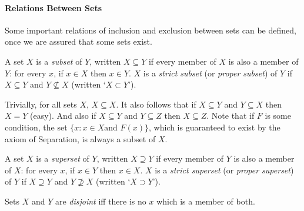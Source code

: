 \paragraph{Relations Between Sets} Some important relations of inclusion and exclusion between sets can be defined, once we are assured that some sets exist.
\begin{definition}[Subset] A set $X$ is a \emph{subset} of $Y$, written
   $X \subseteq Y$ if every
    member of $X$ is also a member of $Y$: for every $x$, if $x \in X$
    then $x \in Y$. $X$ is a \emph{strict subset} (or \emph{proper
    subset}) of $Y$ if $X
    \subseteq Y$ and $Y \not\subseteq X$ (written `$X \subset
Y$').\end{definition}
Trivially, for all sets $X$, $X\subseteq X$. It also follows that if $X \subseteq Y$ and $Y \subseteq X$ then $X=Y$ (easy). And also if $X \subseteq Y$ and $Y \subseteq Z$ then $X \subseteq Z$.
Note that if $F$ is some condition, the set $\{x:x\in X \text{and } F(x)\}$, which is guaranteed to exist by the axiom of Separation, is always a subset of $X$.
\begin{definition}[Superset] A set $X$ is a \emph{superset} of $Y$, written   $X \supseteq Y$ if every    member of $Y$ is also a member of $X$: for every $x$, if $x \in Y$    then $x \in X$. $X$ is a \emph{strict superset} (or \emph{proper superset}) of $Y$ if $X    \supseteq Y$ and $Y \not\supseteq X$ (written `$X \supset Y$').\end{definition}
\begin{definition}[Disjoint] Sets $X$ and $Y$ are \emph{disjoint} iff there is no $x$ which is a member of both.	
\end{definition}


